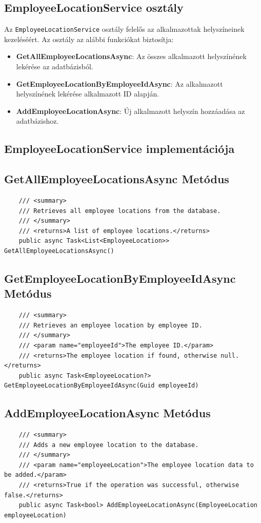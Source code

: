 \documentclass{report}[11pt]
\begin{document}
\subsection{EmployeeLocationService osztály}

Az \texttt{EmployeeLocationService} osztály felelős az alkalmazottak helyszíneinek kezeléséért. Az osztály az alábbi funkciókat biztosítja:

\begin{itemize}
    \item \textbf{GetAllEmployeeLocationsAsync}: Az összes alkalmazott helyszínének lekérése az adatbázisból.
    \item \textbf{GetEmployeeLocationByEmployeeIdAsync}: Az alkalmazott helyszínének lekérése alkalmazott ID alapján.
    \item \textbf{AddEmployeeLocationAsync}: Új alkalmazott helyszín hozzáadása az adatbázishoz.
\end{itemize}

\subsection{EmployeeLocationService implementációja}

\subsection*{GetAllEmployeeLocationsAsync Metódus}
\begin{lstlisting}
    /// <summary>
    /// Retrieves all employee locations from the database.
    /// </summary>
    /// <returns>A list of employee locations.</returns>
    public async Task<List<EmployeeLocation>> GetAllEmployeeLocationsAsync()
\end{lstlisting}

\subsection*{GetEmployeeLocationByEmployeeIdAsync Metódus}
\begin{lstlisting}
    /// <summary>
    /// Retrieves an employee location by employee ID.
    /// </summary>
    /// <param name="employeeId">The employee ID.</param>
    /// <returns>The employee location if found, otherwise null.</returns>
    public async Task<EmployeeLocation?> GetEmployeeLocationByEmployeeIdAsync(Guid employeeId)
\end{lstlisting}

\subsection*{AddEmployeeLocationAsync Metódus}
\begin{lstlisting}
    /// <summary>
    /// Adds a new employee location to the database.
    /// </summary>
    /// <param name="employeeLocation">The employee location data to be added.</param>
    /// <returns>True if the operation was successful, otherwise false.</returns>
    public async Task<bool> AddEmployeeLocationAsync(EmployeeLocation employeeLocation)
\end{lstlisting}
\end{document}
